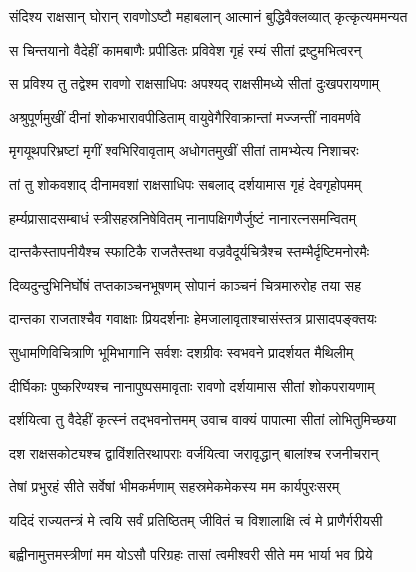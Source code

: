 
\twolineshloka
{संदिश्य राक्षसान् घोरान् रावणोऽष्टौ महाबलान्}
{आत्मानं बुद्धिवैक्लव्यात् कृत्कृत्यममन्यत} %

\twolineshloka
{स चिन्तयानो वैदेहीं कामबाणैः प्रपीडितः}
{प्रविवेश गृहं रम्यं सीतां द्रष्टुमभित्वरन्} %

\twolineshloka
{स प्रविश्य तु तद्वेश्म रावणो राक्षसाधिपः}
{अपश्यद् राक्षसीमध्ये सीतां दुःखपरायणाम्} %

\twolineshloka
{अश्रुपूर्णमुखीं दीनां शोकभारावपीडिताम्}
{वायुवेगैरिवाक्रान्तां मज्जन्तीं नावमर्णवे} %

\twolineshloka
{मृगयूथपरिभ्रष्टां मृगीं श्वभिरिवावृताम्}
{अधोगतमुखीं सीतां तामभ्येत्य निशाचरः} %

\twolineshloka
{तां तु शोकवशाद् दीनामवशां राक्षसाधिपः}
{सबलाद् दर्शयामास गृहं देवगृहोपमम्} %

\twolineshloka
{हर्म्यप्रासादसम्बाधं स्त्रीसहस्रनिषेवितम्}
{नानापक्षिगणैर्जुष्टं नानारत्नसमन्वितम्} %

\twolineshloka
{दान्तकैस्तापनीयैश्च स्फाटिकै राजतैस्तथा}
{वज्रवैदूर्यचित्रैश्च स्तम्भैर्दृष्टिमनोरमैः} %

\twolineshloka
{दिव्यदुन्दुभिनिर्घोषं तप्तकाञ्चनभूषणम्}
{सोपानं काञ्चनं चित्रमारुरोह तया सह} %

\twolineshloka
{दान्तका राजताश्चैव गवाक्षाः प्रियदर्शनाः}
{हेमजालावृताश्चासंस्तत्र प्रासादपङ्क्तयः} %

\twolineshloka
{सुधामणिविचित्राणि भूमिभागानि सर्वशः}
{दशग्रीवः स्वभवने प्रादर्शयत मैथिलीम्} %

\twolineshloka
{दीर्घिकाः पुष्करिण्यश्च नानापुष्पसमावृताः}
{रावणो दर्शयामास सीतां शोकपरायणाम्} %

\twolineshloka
{दर्शयित्वा तु वैदेहीं कृत्स्नं तद्भवनोत्तमम्}
{उवाच वाक्यं पापात्मा सीतां लोभितुमिच्छया} %

\twolineshloka
{दश राक्षसकोट्यश्च द्वाविंशतिरथापराः}
{वर्जयित्वा जरावृद्धान् बालांश्च रजनीचरान्} %

\twolineshloka
{तेषां प्रभुरहं सीते सर्वेषां भीमकर्मणाम्}
{सहस्रमेकमेकस्य मम कार्यपुरःसरम्} %

\twolineshloka
{यदिदं राज्यतन्त्रं मे त्वयि सर्वं प्रतिष्ठितम्}
{जीवितं च विशालाक्षि त्वं मे प्राणैर्गरीयसी} %

\twolineshloka
{बह्वीनामुत्तमस्त्रीणां मम योऽसौ परिग्रहः}
{तासां त्वमीश्वरी सीते मम भार्या भव प्रिये} %

